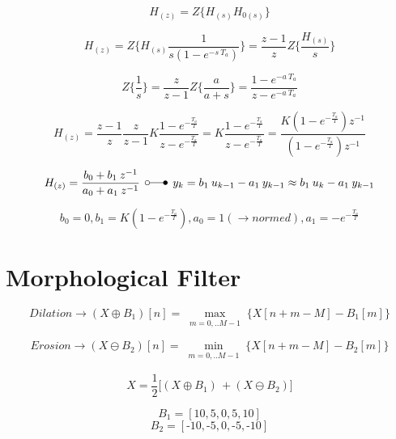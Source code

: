 \documentclass[
    10pt, %
    DIV12,
    english, %
    a5paper, %
    twoside, %
    titlepage, %
    parskip=half, %
    headings=small, %
    listof=totoc, %
    bibliography=totoc, %
    index=totoc, %
    captions=tableheading, %
    final %
]{scrbook}
\begin{document}
\begin{equation}
H_{(z)}=Z\big\{H_{(s)}  H_{0(s)} \big\} \nonumber
\end{equation}

\begin{equation}
H_{(z)}=Z\bigg\{H_{(s)}  \frac{1}{s (1-e^{-s\:T_a})}\bigg\}=\frac{z-1}{z} Z\bigg\{\frac{H_{(s)}}{s}\bigg\} \nonumber
\end{equation}

\begin{equation}
Z\bigg\{\frac{1}{s}\bigg\}=\frac{z}{z-1}
Z\bigg\{\frac{a}{a+s}\bigg\}=\frac{1-e^{-a\:T_a}}{z-e^{-a\: T_a}} \nonumber
\end{equation}

\begin{equation}
H_{(z)}=\frac{z-1}{z} \frac{z}{z-1} K \frac{1-e^{-\frac{T_a}{T}}}{z-e^{-\frac{T_a}{T}}}=K \frac{1-e^{-\frac{T_a}{T}}}{z-e^{-\frac{T_a}{T}}}= \frac{K (1-e^{-\frac{T_a}{T}}) z^{-1}}{(1-e^{-\frac{T_a}{T}}) z^{-1}} \nonumber
\end{equation}

\begin{equation}
H_{(z)}=\frac{b_0+b_1\:z^{-1}}{a_0+a_1\:z^{-1}} \:\: \laplace\:\: y_k=b_1\:u_{k-1}-a_1\:y_{k-1}\approx b_1\:u_{k}-a_1\:y_{k-1} \nonumber
\end{equation}

\begin{equation}
b_0=0, b_1=K(1-e^{-\frac{T_a}{T}}), a_0=1 (\rightarrow normed), a_1=-e^{-\frac{T_a}{T}} \nonumber
\end{equation}

\newpage
\section{Morphological Filter}

\begin{equation}
Dilation \rightarrow (X\oplus B_1)[n] = \max_{\substack{m=0,..M-1}}\Bigg\{X[n+m-M]-B_1[m]\Bigg\} \nonumber
\end{equation}

\begin{equation}
Erosion \rightarrow (X\ominus B_2)[n] = \min_{\substack{m=0,..M-1}}\Bigg\{X[n+m-M]-B_2[m]\Bigg\} \nonumber
\end{equation}


\begin{equation}
X=\frac{1}{2}\big [(X\oplus B_1) \, + (X\ominus B_2) ] \nonumber
\end{equation}

\begin{equation}
B_1=[10, 5, 0, 5, 10] \nonumber
\end{equation}
\begin{equation}
 B_2=[\text{-}10, \text{-}5, 0, \text{-}5, \text{-}10] \nonumber
\end{equation}
\end{document}
